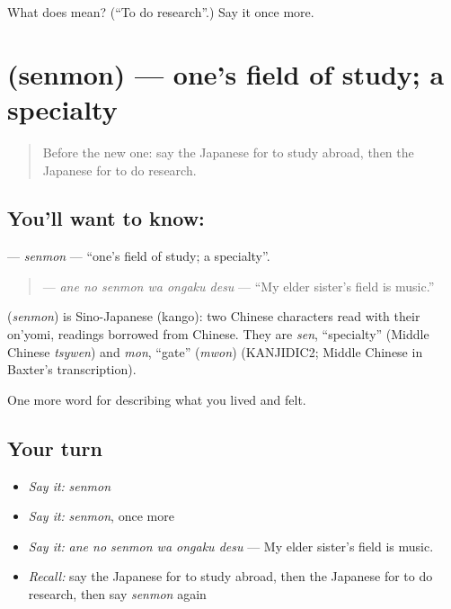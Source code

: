 \begin{tcolorbox}[breakable,colback=teal!4,colframe=teal!35!black,title={Before you move on}]
What does  mean? (\textquotedblleft{}To do research\textquotedblright{}.) Say it once more.
\end{tcolorbox}
\section[\texorpdfstring{\ja{せんもん} (senmon)}{せんもん (senmon)}]{ (senmon) — one's field of study; a specialty}

\label{lesson:JA-C459-senmon}



\begin{quote}
Before the new one: say the Japanese for to study abroad, then the Japanese for to do research.
\end{quote}

\subsection*{You'll want to know: }
\textbf{} — \emph{senmon} — \textquotedblleft{}one's field of study; a specialty\textquotedblright{}.

\begin{quote}
\textbf{  } — \emph{ane no senmon wa ongaku desu} — \textquotedblleft{}My elder sister's field is music.\textquotedblright{}
\end{quote}

\begin{cousinweb}
\textbf{} (\emph{senmon}) is Sino-Japanese (kango): two Chinese characters read with their on'yomi, readings borrowed from Chinese. They are \emph{sen}, \textquotedblleft{}specialty\textquotedblright{} (Middle Chinese \emph{tsywen}) and \emph{mon}, \textquotedblleft{}gate\textquotedblright{} (\emph{mwon}) (KANJIDIC2; Middle Chinese in Baxter's transcription).
\end{cousinweb}

\begin{grammarlens}[title={What you've built}]
One more word for describing what you lived and felt.
\end{grammarlens}

\subsection*{Your turn}
\begin{itemize}
\raggedright
  \item \emph{Say it:} \emph{senmon}
  \item \emph{Say it:} \emph{senmon}, once more
  \item \emph{Say it:} \emph{ane no senmon wa ongaku desu} — My elder sister's field is music.
  \item \emph{Recall:} say the Japanese for to study abroad, then the Japanese for to do research, then say \emph{senmon} again
\end{itemize}

